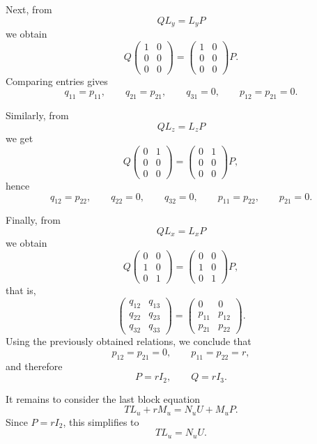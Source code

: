 \documentclass[11pt]{article}
\theoremstyle{plain}
\theoremstyle{remark}
\begin{document}
	Next, from
	\[
	QL_y=L_yP
	\]
	we obtain
	\[
	Q
	\begin{pmatrix}
		1&0\\
		0&0\\
		0&0
	\end{pmatrix}
	=
	\begin{pmatrix}
		1&0\\
		0&0\\
		0&0
	\end{pmatrix}
	P.
	\]
	Comparing entries gives
	\[
	q_{11}=p_{11},\qquad q_{21}=p_{21},\qquad q_{31}=0,
	\qquad p_{12}=p_{21}=0.
	\]
	
	Similarly, from
	\[
	QL_z=L_zP
	\]
	we get
	\[
	Q
	\begin{pmatrix}
		0&1\\
		0&0\\
		0&0
	\end{pmatrix}
	=
	\begin{pmatrix}
		0&1\\
		0&0\\
		0&0
	\end{pmatrix}
	P,
	\]
	hence
	\[
	q_{12}=p_{22},\qquad q_{22}=0,\qquad q_{32}=0,
	\qquad p_{11}=p_{22},\qquad p_{21}=0.
	\]
	
	Finally, from
	\[
	QL_x=L_xP
	\]
	we obtain
	\[
	Q
	\begin{pmatrix}
		0&0\\
		1&0\\
		0&1
	\end{pmatrix}
	=
	\begin{pmatrix}
		0&0\\
		1&0\\
		0&1
	\end{pmatrix}
	P,
	\]
	that is,
	\[
	\begin{pmatrix}
		q_{12}&q_{13}\\
		q_{22}&q_{23}\\
		q_{32}&q_{33}
	\end{pmatrix}
	=
	\begin{pmatrix}
		0&0\\
		p_{11}&p_{12}\\
		p_{21}&p_{22}
	\end{pmatrix}.
	\]
	Using the previously obtained relations, we conclude that
	\[
	p_{12}=p_{21}=0,\qquad p_{11}=p_{22}=r,
	\]
	and therefore
	\[
	P=rI_2,\qquad Q=rI_3.
	\]
	
	It remains to consider the last block equation
	\[
	TL_u+rM_u=N_uU+M_uP.
	\]
	Since \(P=rI_2\), this simplifies to
	\[
	TL_u=N_uU.
	\]
	
\end{document}
